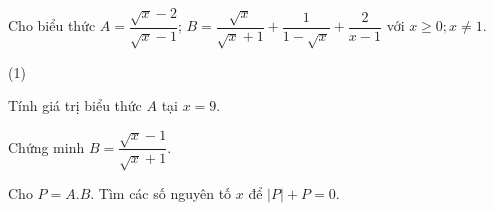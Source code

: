 
\begin{bt}
Cho biểu thức $A = \dfrac{\sqrt{x}-2}{\sqrt{x}-1}$; $B = \dfrac{\sqrt{x}}{\sqrt{x}+1} + \dfrac{1}{1-\sqrt{x}} + \dfrac{2}{x-1}$ với $x \ge 0; x \ne 1$.
\begin{cacy}(1)
\item Tính giá trị biểu thức $A$ tại $x = 9$.
\item Chứng minh $B = \dfrac{\sqrt{x}-1}{\sqrt{x}+1}$.
\item Cho $P = A.B$. Tìm các số nguyên tố $x$ để $|P| + P = 0$.
\end{cacy}
\loigiai{}
\end{bt}

